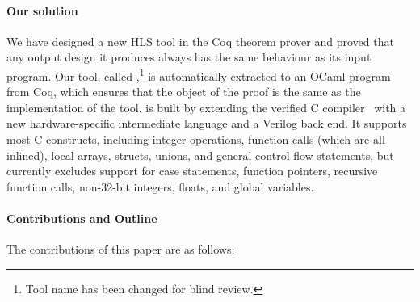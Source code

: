 \paragraph{Our solution}
We have designed a new HLS tool in the Coq theorem prover and proved that any output design it produces always has the same behaviour as its input program. Our tool, called \vericert{},\ifANONYMOUS\footnote{Tool name has been changed for blind review.}\fi{} is automatically extracted to an OCaml program from Coq, which ensures that the object of the proof is the same as the implementation of the tool. \vericert{} is built by extending the \compcert{} verified C compiler~\cite{leroy09_formal_verif_realis_compil} with a new hardware-specific intermediate language and a Verilog back end. It supports most C constructs, including integer operations, function calls (which are all inlined), local arrays, structs, unions, and general control-flow statements, but currently excludes support for case statements, function pointers, recursive function calls, non-32-bit integers, floats, and global variables.

\paragraph{Contributions and Outline}
The contributions of this paper are as follows:

